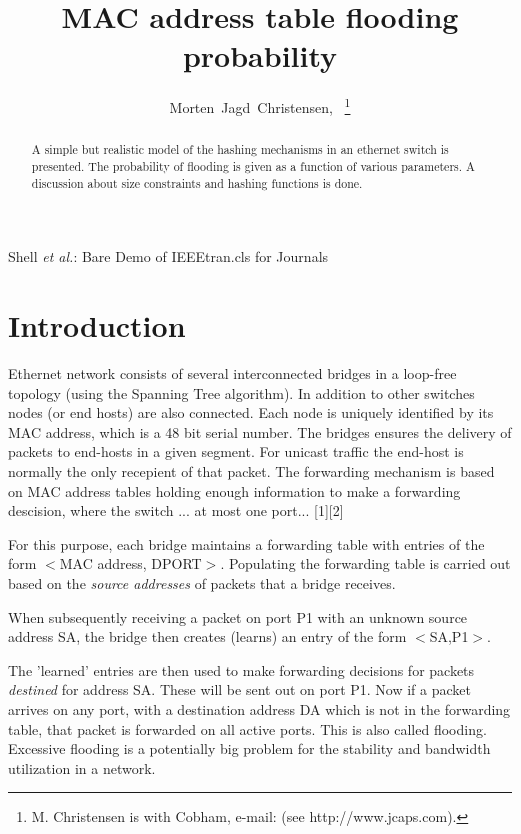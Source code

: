 \documentclass[journal]{IEEEtran}
\begin{document}
\title{MAC address table flooding probability}

\author{Morten~Jagd~Christensen,~%
\thanks{M. Christensen is with Cobham, e-mail: (see http://www.jcaps.com).}%
}


%
{Shell \MakeLowercase{\textit{et al.}}: Bare Demo of IEEEtran.cls for Journals}

\maketitle

\begin{abstract}
A simple but realistic model of the hashing mechanisms in an ethernet switch is presented. The probability 
of flooding is given as a function of various parameters. A discussion about size constraints and hashing functions
is done.
\end{abstract}

\section{Introduction}
 Ethernet network consists of several interconnected bridges
in a loop-free topology (using the Spanning Tree algorithm). In 
addition to other switches nodes (or end hosts) are also connected.
Each node is uniquely identified by its MAC address, which is a 48 bit 
serial number. The bridges ensures the delivery of packets to end-hosts
in a given segment. For unicast traffic the end-host is normally the only recepient 
of that packet. The forwarding mechanism is based on MAC address
tables holding enough information to make a forwarding descision,
where the switch ... at most one port... [1][2]

For this purpose, each bridge maintains a forwarding table with entries
of the form $<$MAC address, DPORT$>$. 
Populating the forwarding table is carried out based on the
{\em source addresses} of packets that a bridge receives. 

When subsequently receiving a packet on port P1 with an unknown
source address SA, the bridge then creates (learns) an entry of the form
$<$SA,P1$>$.

The 'learned' entries are then used to make forwarding
decisions for packets {\em destined} for address SA. These
will be sent out on port P1. Now if a packet arrives on 
any port, with a destination address DA which is not in the 
forwarding table, that packet is forwarded on all active ports.
This is also called flooding. Excessive flooding is a potentially big 
problem for the stability and bandwidth utilization in a network.
\end{document}
